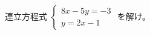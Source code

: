 \documentclass[../../../../hsm_tok_q.tex]{subfiles}
\begin{document}
    連立方程式 $\begin{cases} 8x - 5y = -3 \\ y = 2x - 1 \end{cases}$ を解け。
\end{document}
